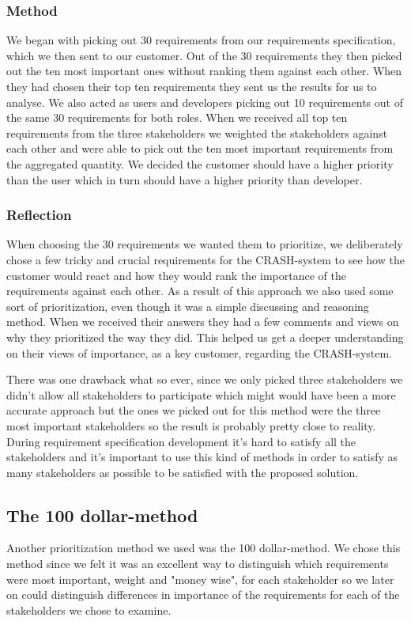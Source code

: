 \documentclass[10pt]{article}
\begin{document}
\subsubsection{Method}
We began with picking out 30 requirements from our requirements specification, which we then sent to our customer. Out of the 30 requirements they then picked out the ten most important ones without ranking them against each other. When they had chosen their top ten requirements they sent us the results for us to analyse. We also acted as users and developers picking out 10 requirements out of the same 30 requirements for both roles. When we received all top ten requirements from the three stakeholders we weighted the stakeholders against each other and were able to pick out the ten most important requirements from the aggregated quantity. We decided the customer should have a higher priority than the user which in turn should have a higher priority than developer.
\subsubsection{Reflection}
When choosing the 30 requirements we wanted them to prioritize, we deliberately chose a few tricky and crucial requirements for the CRASH-system to see how the customer would react and how they would rank the importance of the requirements against each other. As a result of this approach we also used some sort of prioritization, even though it was a simple discussing and reasoning method. When we received their answers they had a few comments and views on why they prioritized the way they did. This helped us get a deeper understanding on their views of importance, as a key customer, regarding the CRASH-system.

There was one drawback what so ever, since we only picked three stakeholders we didn't allow all stakeholders to participate which might would have been a more accurate approach but the ones we picked out for this method were the three most important stakeholders so the result is probably pretty close to reality.
During requirement specification development it's hard to satisfy all the stakeholders and it's important to use this kind of methods in order to satisfy as many stakeholders as possible to be satisfied with the proposed solution.

\subsection{The 100 dollar-method}
Another prioritization method we used was the 100 dollar-method. We chose this method since we felt it was an excellent way to distinguish which requirements were most important, weight and "money wise", for each stakeholder so we later on could distinguish differences in importance of the requirements for each of the stakeholders we chose to examine.
\end{document}
